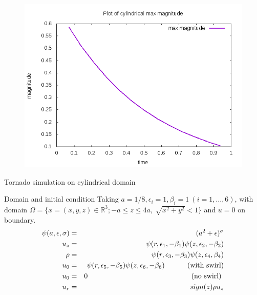 \documentclass{beamer}
\newcommand{\R}{\mathbb{R}}
\begin{document}
\begin{frame}
\begin{figure}
	\centering
	\includegraphics[width=1\linewidth]{NS_3D/magnitude_cyl}
	\caption{}
	\label{fig:magnitudecyl}
\end{figure}
\end{frame}

\begin{frame}{Tornado simulation on cylindrical domain}
	\begin{block}{Domain and initial condition}
		Taking $ a=1/8, \epsilon_{i} =1, \beta_{i}=1 \ (i=1,\dots,6) $, with domain $ \Omega = \{ x=(x,y,z) \in \R^3 ; -a\leq z\leq 4a, \ \sqrt{x^2+y^2}<1 \} $ and $ u=0 $ on boundary.
		\begin{eqnarray}\nonumber
		\psi(a,\epsilon,\sigma) &=& (a^{2}+\epsilon)^{\sigma}\\ \nonumber
		u_{z} &=& \psi(r,\epsilon_{1},-\beta_{1})\psi(z,\epsilon_{2},-\beta_{2})\\ \nonumber
		\rho &=& \psi(r,\epsilon_{3},-\beta_{3})\psi(z,\epsilon_{4},\beta_{4})\\ \nonumber
		u_{0} &=& \psi(r,\epsilon_{5},-\beta_{5})\psi(z,\epsilon_{6},-\beta_{6}) \text{\hspace{1cm} (with swirl)}\\ \nonumber
		u_{0} &=& 0 \text{ \hspace{5cm}(no swirl) }\\ \nonumber
		u_{r} &=& sign(z)\rho u_{z}
		\end{eqnarray}
	\end{block}
\end{frame}
\end{document}

